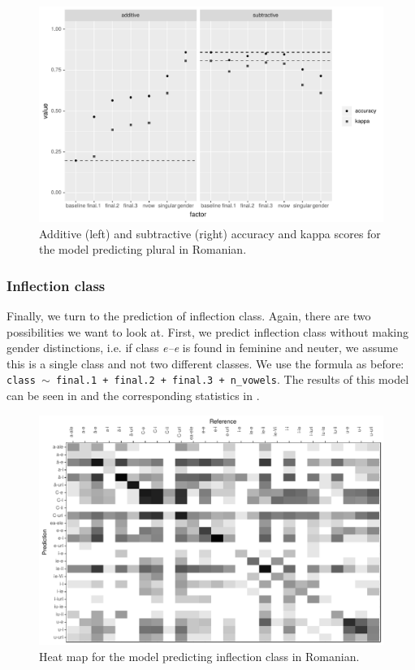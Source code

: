 \begin{figure}[!htpb]
  \centering
  \includegraphics[width=1.0\textwidth]{./figures/romanian/plural-overall.pdf}
  \caption{Additive (left) and subtractive (right) accuracy and kappa scores for the model predicting plural in Romanian. }\label{fig:romanian-eval-pl}
\end{figure}

\subsubsection{Inflection class}

Finally, we turn to the prediction of inflection class. Again, there are two possibilities we want to look at. First, we predict inflection class without making gender distinctions, i.e. if class \textit{e--e} is found in feminine and neuter, we assume this is a single class and not two different classes. We use the formula as before: \texttt{class $\sim$ final.1 + final.2 + final.3 + n\_vowels}. The results of this model can be seen in  and the corresponding statistics in .

\begin{figure}[!htpb]
  \centering
  \includegraphics[width=1.0\textwidth]{./figures/romanian/class-1-cm.pdf}
  \caption{Heat map for the model predicting inflection class in Romanian.}\label{fig:class-1-cm-romanian}
\end{figure}



